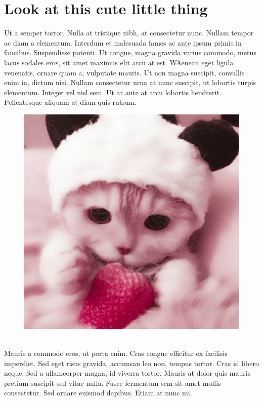 \documentclass[10pt,a4paper]{report}
\begin{document}
\section{Look at this cute little thing}
Ut a semper tortor. Nulla at tristique nibh, at consectetur nunc. Nullam tempor ac diam a elementum. Interdum et malesuada fames ac ante ipsum primis in faucibus. Suspendisse potenti. Ut congue, magna gravida varius commodo, metus lacus sodales eros, sit amet maximus elit arcu at est.
WAenean eget ligula venenatis, ornare quam a, vulputate mauris. Ut non magna suscipit, convallis enim in, dictum nisi. Nullam consectetur urna at nunc suscipit, ut lobortis turpis elementum. Integer vel nisl sem. Ut at ante at arcu lobortis hendrerit. Pellentesque aliquam at diam quis rutrum. \\
\begin{figure}[h]
\includegraphics[width=\textwidth]{images/5.jpg}
\end{figure} \\
Mauris a commodo eros, ut porta enim. Cras congue efficitur ex facilisis imperdiet. Sed eget risus gravida, accumsan leo non, tempus tortor. Cras id libero neque. Sed a ullamcorper magna, id viverra tortor. Mauris at dolor quis mauris pretium suscipit sed vitae nulla. Fusce fermentum sem sit amet mollis consectetur. Sed ornare euismod dapibus. Etiam at nunc mi.\cite{noble2004support}\\
\end{document}
